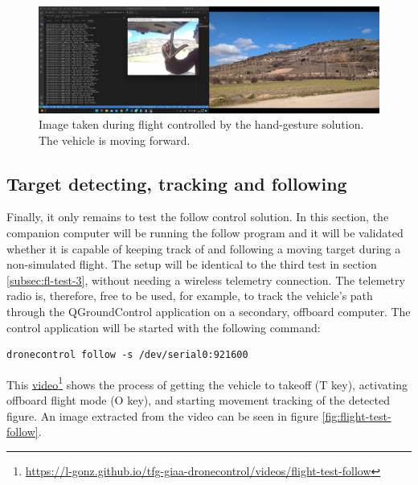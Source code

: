 \begin{figure}
  \centering
  \includegraphics[width=\textwidth, keepaspectratio]{img/video-field-test-hand.png}
  \caption{Image taken during flight controlled by the hand-gesture solution. The vehicle is moving forward.}
  \label{fig:flight-test-hand}
\end{figure}

\subsection{Target detecting, tracking and following}
\label{subsec:fl-test-5}


Finally, it only remains to test the follow control solution.
In this section, the companion computer will be running the follow program and it will be validated whether it is capable of keeping track of and following a moving target during a non-simulated flight.
The setup will be identical to the third test in section \ref{subsec:fl-test-3}, without needing a wireless telemetry connection.
The telemetry radio is, therefore, free to be used, for example, to track the vehicle's path through the QGroundControl application on a secondary, offboard computer.
The control application will be started with the following command:
\begin{verbatim}
dronecontrol follow -s /dev/serial0:921600
\end{verbatim}
This \href{https://l-gonz.github.io/tfg-giaa-dronecontrol/videos/flight-test-follow}{video}\footnote{\url{https://l-gonz.github.io/tfg-giaa-dronecontrol/videos/flight-test-follow}} shows the process of getting the vehicle to takeoff (T key), activating offboard flight mode (O key), and starting movement tracking of the detected figure.
An image extracted from the video can be seen in figure \ref{fig:flight-test-follow}.



